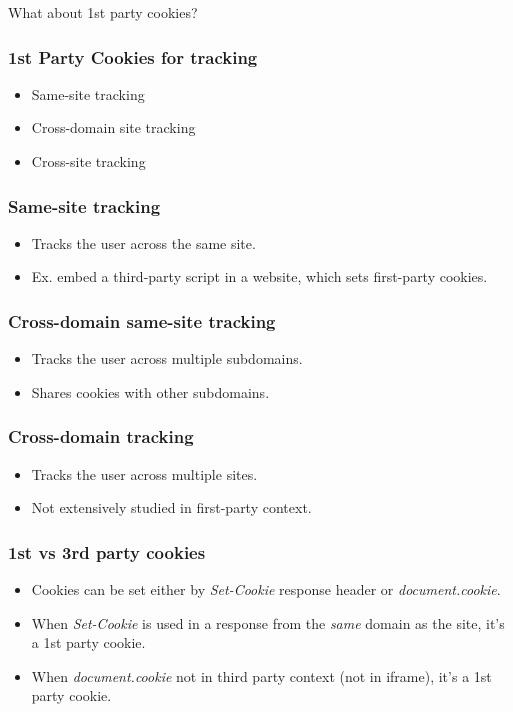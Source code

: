 \documentclass{beamer}
\begin{document}
\begin{frame}
\centering
What about 1st party cookies?
\end{frame}


\begin{frame}
\frametitle{1st Party Cookies for tracking}

\begin{itemize}
\item Same-site tracking
\item Cross-domain site tracking
\item Cross-site tracking
\end{itemize}
\end{frame}

\begin{frame}
\frametitle{Same-site tracking}
\begin{itemize}
\item Tracks the user across the same site.
\item Ex. embed a third-party script in a website, which sets first-party cookies.
\end{itemize}
\end{frame}

\begin{frame}
\frametitle{Cross-domain same-site tracking}
\begin{itemize}
\item Tracks the user across multiple subdomains.
\item Shares cookies with other subdomains.
\end{itemize}
\end{frame}


\begin{frame}
\frametitle{Cross-domain tracking}
\begin{itemize}
\item Tracks the user across multiple sites.
\item Not extensively studied in first-party context.
\end{itemize}
\end{frame}

\begin{frame}
\frametitle{1st vs 3rd party cookies}
\begin{itemize}
\item Cookies can be set either by \textit{Set-Cookie} response header or \textit{document.cookie}.
\item When \textit{Set-Cookie} is used in a response from the \textit{same} domain as the site, it's a 1st party cookie.
\item When \textit{document.cookie} not in third party context (not in iframe), it's a 1st party cookie.
\end{itemize}
\end{frame}
\end{document}
